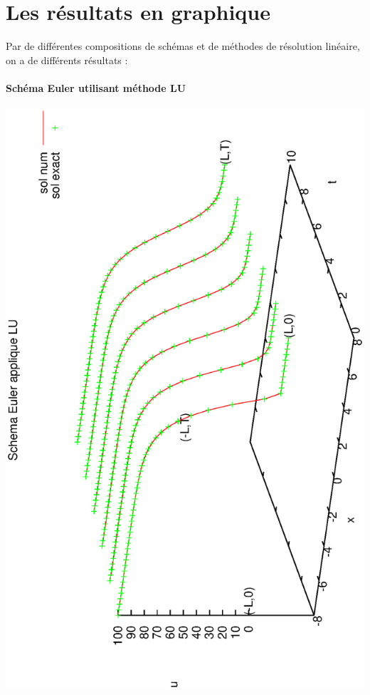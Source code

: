 \documentclass{book}
\begin{document}
\section{Les résultats en graphique}
Par de différentes compositions de schémas et de méthodes de résolution linéaire, on a de différents résultats : \\
\paragraph{Schéma Euler utilisant méthode LU}
\begin{center}
\includegraphics[angle=-90, scale=0.40]{EulerLU}%
\end{center}
\end{document}
